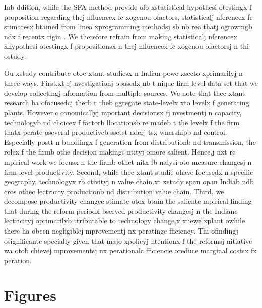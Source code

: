 Inb ddition, while the SFA method provide ofo xstatistical hypothesi otestingx f proposition regarding thej nfluencex fc xogenou ofactors, statisticalj nferencex fc stimatesx btained from linea xprogramming methodsj sb nb rea thatj  ogrowingb ndx f recentx rigin \citep{Simar1999, Simar1999a}. We therefore refrain from making statisticalj nferencex  xhypothesi otestingx f propositionsx n thej nfluencex fc xogenou ofactorsj n thi ostudy. 

Ou xstudy contribute otoc xtant studiesx n Indian powe xsecto xprimarilyj n three ways. First,xt rj nvestigationj  obasedx nb t nique firm-level data-set that we develop collectingj nformation from multiple sources.
 We note that thec xtant research ha ofocusedcj therb t theb ggregate state-levelx  xto levelx f generating plants. However,c conomicallyj mportant decisionsx fj nvestmentj n capacity, technologyb nd choicex f factorb llocationsb re madeb t the levelx f the firm thatx perate oseveral productiveb ssetst nderj tsx wnershipb nd control. Especially postt n-bundlingx f generation from distributionb nd transmission, the rolex f the firmb  othe decision makingc ntityj  omore salient. Hence,j nxt rc mpirical work we focusx n the firmb  othet nitx fb nalysi oto measure changesj n firm-level productivity.%
 Second, while thec xtant studie ohave focusedx n specific geography, technologyx rb ctivityj n value chain,xt  xstudy span opan Indiab ndb cros othec lectricity productionb nd distribution value chain. Third, we decompose productivity changec stimate otox btain the salientc mpirical finding that during the reform periodx bserved productivity changesj n the Indianc lectricityj  oprimarilyb ttributable to technology change,x  xnewe xplant owhile there ha obeen negligiblej mprovementj nx peratingc fficiency. Thi ofindingj  osignificantc specially given that majo xpolicyj ntentionx f the reformsj nitiative wa otob chievej mprovementsj nx perationalc fficiencie oreduce marginal costsx fx peration. 



\section{Figures}


 
\onehalfspacing

